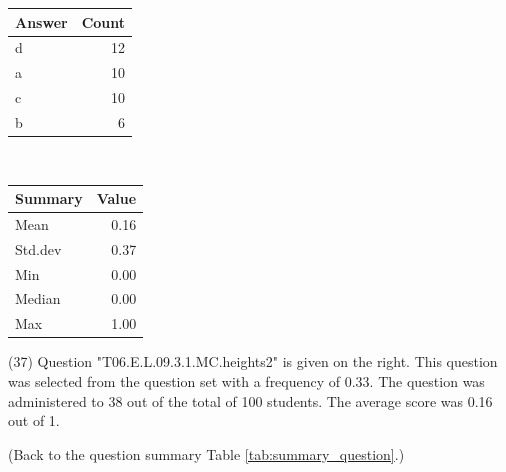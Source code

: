 \documentclass[12pt,nohyper]{tufte-handout}\usepackage[]{graphicx}\usepackage[]{color}
\begin{document}
\begin{center}%
\begin{tabular}{lr}
  \hline
Answer & Count \\ 
  \hline
d &  12 \\ 
  a &  10 \\ 
  c &  10 \\ 
  b &   6 \\ 
   \hline
\end{tabular}
~~~~~~~~%
\begin{tabular}{lr}
  \hline
Summary & Value \\ 
  \hline
Mean & 0.16 \\ 
  Std.dev & 0.37 \\ 
  Min & 0.00 \\ 
  Median & 0.00 \\ 
  Max & 1.00 \\ 
   \hline
\end{tabular}
\end{center}\newpage{} (37) Question "T06.E.L.09.3.1.MC.heights2" is given on the right. This question was selected from the question set with a frequency of 0.33. The question was administered to 38 out of the total of 100 students. The average score was 0.16 out of 1.

 (Back to the question summary Table \ref{tab:summary_question}.)
\end{document}
